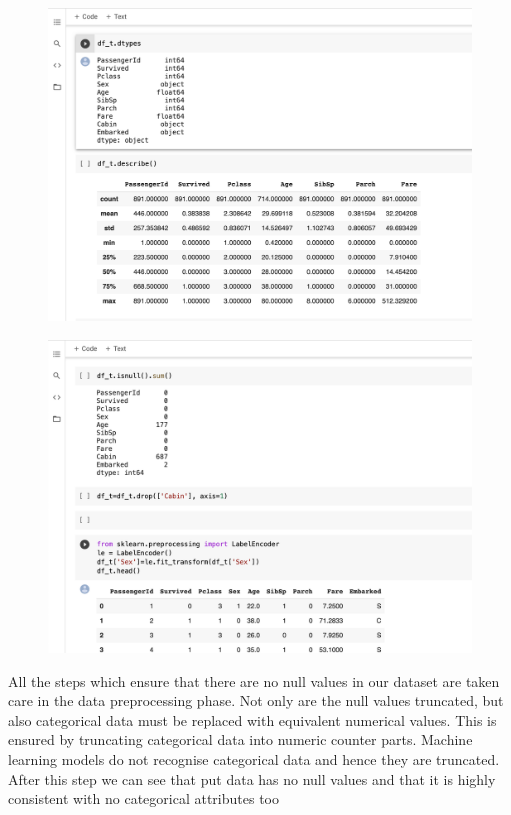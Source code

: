 \documentclass[12pt]{article}
\newcommand{\nd}{\noindent}
\begin{document}
\vspace{10mm}
\hspace{-5mm}
\begin{figure}[h]
\centering
\begin{minipage}{.5\textwidth}
  \centering
  \includegraphics[width=1.2\linewidth]{part5.png}
  \label{fig:test1}
\end{minipage}%
\begin{minipage}{.5\textwidth}
  \centering
  \includegraphics[width=1.2\linewidth]{part6.png}
  \label{fig:test2}
\end{minipage}
\end{figure}

\nd All the steps which ensure that there are no null values in our dataset are taken care in the data preprocessing phase. Not only are the null values truncated, but also categorical data must be replaced with equivalent numerical values. This is ensured by truncating categorical data into numeric counter parts. Machine learning models do not recognise categorical data and hence they are truncated.
\newpage 
\nd After this step we can see that put data has no null values and that it is highly consistent with no categorical attributes too 
\end{document}

